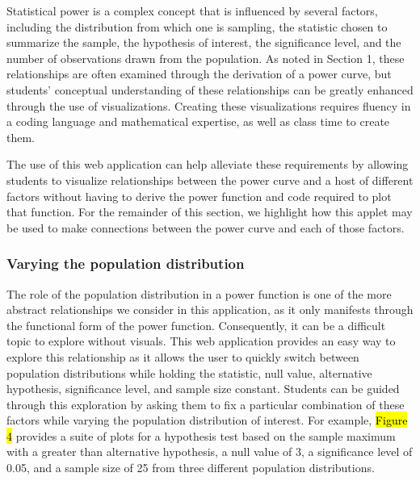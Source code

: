 \documentclass{TISE}
\begin{document}
Statistical power is a complex concept that is influenced by several factors, including the distribution from which one is sampling, the statistic chosen to summarize the sample, the hypothesis of interest, the significance level, and the number of observations drawn from the population. As noted in Section 1, these relationships are often examined through the derivation of a power curve, but students' conceptual understanding of these relationships can be greatly enhanced through the use of visualizations. Creating these visualizations requires fluency in a coding language and mathematical expertise, as well as class time to create them. 

The use of this web application can help alleviate these requirements by allowing students to visualize relationships between the power curve and a host of different factors without having to derive the power function and code required to plot that function. For the remainder of this section, we highlight how this applet may be used to make connections between the power curve and each of those factors.

\subsubsection{Varying the population distribution}

The role of the population distribution in a power function is one of the more abstract relationships we consider in this application, as it only manifests through the functional form of the power function. Consequently, it can be a difficult topic to explore without visuals. This web application provides an easy way to explore this relationship as it allows the user to quickly switch between population distributions while holding the statistic, null value, alternative hypothesis, significance level, and sample size constant. Students can be guided through this exploration by asking them to fix a particular combination of these factors while varying the population distribution of interest. For example, \hl{Figure 4} provides a suite of plots for a hypothesis test based on the sample maximum with a greater than alternative hypothesis, a null value of 3, a significance level of 0.05, and a sample size of 25 from three different population distributions.
\end{document}
